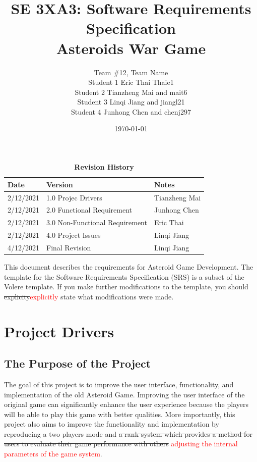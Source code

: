 \documentclass[12pt, titlepage]{article}
\title{SE 3XA3: Software Requirements Specification\\Asteroids War Game}
\author{Team \#12, Team Name
		\\ Student 1 Eric Thai Thaie1
		\\ Student 2 Tianzheng Mai and mait6
		\\ Student 3 Linqi Jiang and jiangl21
		\\ Student 4 Junhong Chen and chenj297
}
\date{\today}
\begin{document}
\begin{table}[bp]
\caption{\bf Revision History}
\begin{tabularx}{\textwidth}{p{3cm}p{2cm}X}
\toprule {\bf Date} & {\bf Version} & {\bf Notes}\\
\midrule
2/12/2021 & 1.0 Projec Drivers & Tianzheng Mai\\
2/12/2021 & 2.0 Functional Requirement & Junhong Chen\\
2/12/2021 & 3.0 Non-Functional Requirement & Eric Thai\\
2/12/2021 & 4.0 Project Issues & Linqi Jiang\\
4/12/2021 & Final Revision & Linqi Jiang\\
\bottomrule
\end{tabularx}
\end{table}
\newpage
\maketitle

\tableofcontents
\listoftables
\listoffigures



\newpage


This document describes the requirements for Asteroid Game Development. The template for the Software Requirements Specification (SRS) is a subset of the Volere
template.  If you make further modifications
to the template, you should \sout{explicity}\textcolor{red}{explicitly} state what modifications were made.

\section{Project Drivers}

\subsection{The Purpose of the Project}
The goal of this project is to improve the user interface, functionality, and implementation of the old Asteroid Game. Improving the user interface of the original game can significantly enhance the user experience because the players will be able to play this game with better qualities. More importantly, this project also aims to improve the functionality and implementation by reproducing a two players mode and \sout{a rank system which provides a method for users to evaluate their game performance with others} \textcolor{red}{adjusting the internal parameters of the game system}.
\end{document}
